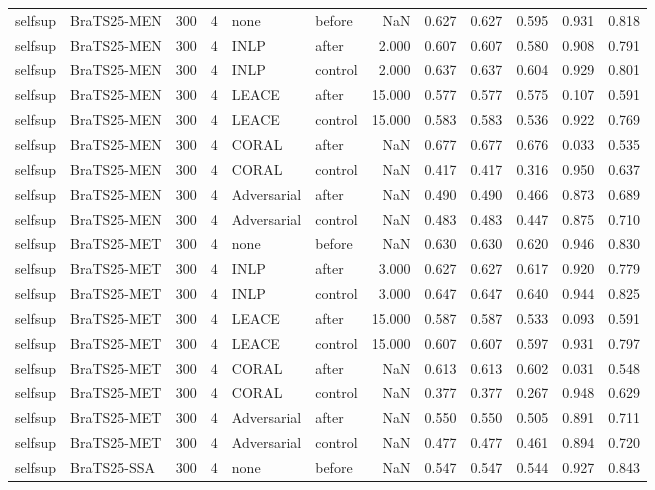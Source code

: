 \begin{tabular}{llrrllrrrrrr}
selfsup & BraTS25-MEN & 300 & 4 & none & before & NaN & 0.627 & 0.627 & 0.595 & 0.931 & 0.818 \\
selfsup & BraTS25-MEN & 300 & 4 & INLP & after & 2.000 & 0.607 & 0.607 & 0.580 & 0.908 & 0.791 \\
selfsup & BraTS25-MEN & 300 & 4 & INLP & control & 2.000 & 0.637 & 0.637 & 0.604 & 0.929 & 0.801 \\
selfsup & BraTS25-MEN & 300 & 4 & LEACE & after & 15.000 & 0.577 & 0.577 & 0.575 & 0.107 & 0.591 \\
selfsup & BraTS25-MEN & 300 & 4 & LEACE & control & 15.000 & 0.583 & 0.583 & 0.536 & 0.922 & 0.769 \\
selfsup & BraTS25-MEN & 300 & 4 & CORAL & after & NaN & 0.677 & 0.677 & 0.676 & 0.033 & 0.535 \\
selfsup & BraTS25-MEN & 300 & 4 & CORAL & control & NaN & 0.417 & 0.417 & 0.316 & 0.950 & 0.637 \\
selfsup & BraTS25-MEN & 300 & 4 & Adversarial & after & NaN & 0.490 & 0.490 & 0.466 & 0.873 & 0.689 \\
selfsup & BraTS25-MEN & 300 & 4 & Adversarial & control & NaN & 0.483 & 0.483 & 0.447 & 0.875 & 0.710 \\
selfsup & BraTS25-MET & 300 & 4 & none & before & NaN & 0.630 & 0.630 & 0.620 & 0.946 & 0.830 \\
selfsup & BraTS25-MET & 300 & 4 & INLP & after & 3.000 & 0.627 & 0.627 & 0.617 & 0.920 & 0.779 \\
selfsup & BraTS25-MET & 300 & 4 & INLP & control & 3.000 & 0.647 & 0.647 & 0.640 & 0.944 & 0.825 \\
selfsup & BraTS25-MET & 300 & 4 & LEACE & after & 15.000 & 0.587 & 0.587 & 0.533 & 0.093 & 0.591 \\
selfsup & BraTS25-MET & 300 & 4 & LEACE & control & 15.000 & 0.607 & 0.607 & 0.597 & 0.931 & 0.797 \\
selfsup & BraTS25-MET & 300 & 4 & CORAL & after & NaN & 0.613 & 0.613 & 0.602 & 0.031 & 0.548 \\
selfsup & BraTS25-MET & 300 & 4 & CORAL & control & NaN & 0.377 & 0.377 & 0.267 & 0.948 & 0.629 \\
selfsup & BraTS25-MET & 300 & 4 & Adversarial & after & NaN & 0.550 & 0.550 & 0.505 & 0.891 & 0.711 \\
selfsup & BraTS25-MET & 300 & 4 & Adversarial & control & NaN & 0.477 & 0.477 & 0.461 & 0.894 & 0.720 \\
selfsup & BraTS25-SSA & 300 & 4 & none & before & NaN & 0.547 & 0.547 & 0.544 & 0.927 & 0.843 \\

\end{tabular}
